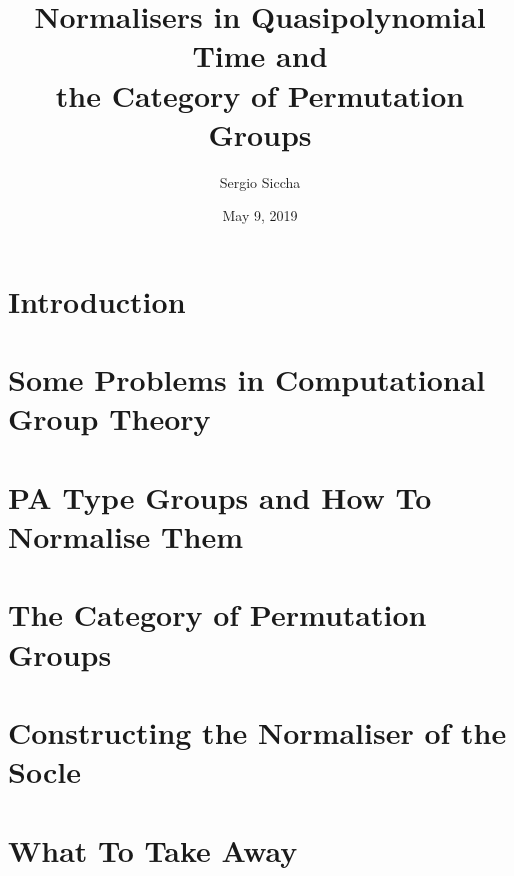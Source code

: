 \documentclass{beamer}
\title{Normalisers in Quasipolynomial Time and \\
the Category of Permutation Groups}
\date{May 9, 2019}
\author{Sergio Siccha}
\institute{Lehrstuhl B f\"ur Mathematik, RWTH Aachen}
\theoremstyle{plain}
\theoremstyle{definition}
\begin{document}
\maketitle
\section{Introduction}


\section{Some Problems in Computational Group Theory}


\section{PA Type Groups and How To Normalise Them}


\section{The Category of Permutation Groups}

\section{Constructing the Normaliser of the Socle}

\section{What To Take Away}
\end{document}

